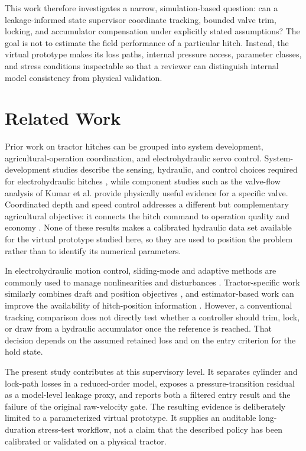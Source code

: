 \documentclass[agriengineering,article,submit,moreauthors]{Definitions/mdpi}
\begin{document}
This work therefore investigates a narrow, simulation-based question: can a leakage-informed state supervisor coordinate tracking, bounded valve trim, locking, and accumulator compensation under explicitly stated assumptions? The goal is not to estimate the field performance of a particular hitch. Instead, the virtual prototype makes its loss paths, internal pressure access, parameter classes, and stress conditions inspectable so that a reviewer can distinguish internal model consistency from physical validation.

\section{Related Work}
Prior work on tractor hitches can be grouped into system development, agricultural-operation coordination, and electrohydraulic servo control. System-development studies describe the sensing, hydraulic, and control choices required for electrohydraulic hitches \cite{sun2022}, while component studies such as the valve-flow analysis of Kumar et al. \cite{kumar2021} provide physically useful evidence for a specific valve. Coordinated depth and speed control addresses a different but complementary agricultural objective: it connects the hitch command to operation quality and economy \cite{sun2025}. None of these results makes a calibrated hydraulic data set available for the virtual prototype studied here, so they are used to position the problem rather than to identify its numerical parameters.

In electrohydraulic motion control, sliding-mode and adaptive methods are commonly used to manage nonlinearities and disturbances \cite{bai2010,tang2011,jin2013}. Tractor-specific work similarly combines draft and position objectives \cite{liu2023}, and estimator-based work can improve the availability of hitch-position information \cite{kim2025}. However, a conventional tracking comparison does not directly test whether a controller should trim, lock, or draw from a hydraulic accumulator once the reference is reached. That decision depends on the assumed retained loss and on the entry criterion for the hold state.

The present study contributes at this supervisory level. It separates cylinder and lock-path losses in a reduced-order model, exposes a pressure-transition residual as a model-level leakage proxy, and reports both a filtered entry result and the failure of the original raw-velocity gate. The resulting evidence is deliberately limited to a parameterized virtual prototype. It supplies an auditable long-duration stress-test workflow, not a claim that the described policy has been calibrated or validated on a physical tractor.
\end{document}

